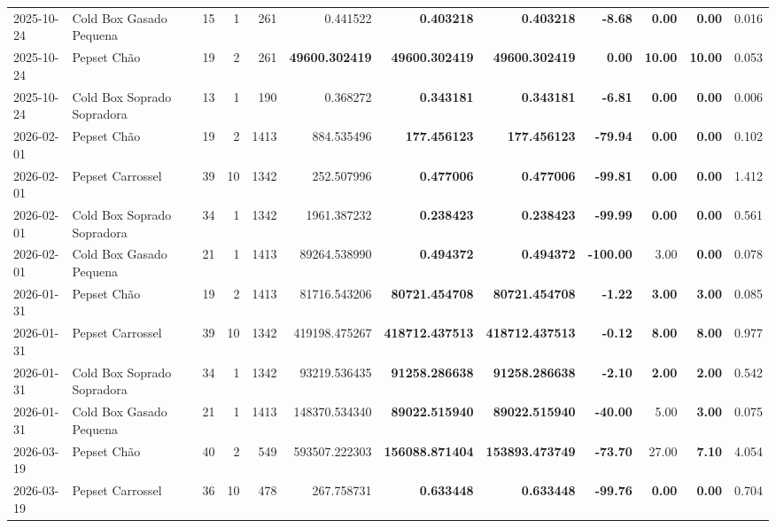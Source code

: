 {\begin{center}
{\begin{tabular}{@{}llrrrrrrrrrr@{}}
2025-10-24 & Cold Box Gasado Pequena & 15 & 1 & 261 & 0.441522 & \textbf{0.403218} & \textbf{0.403218} & \textbf{-8.68} & \textbf{0.00} & \textbf{0.00} & 0.016 \\
2025-10-24 & Pepset Chão & 19 & 2 & 261 & \textbf{49600.302419} & \textbf{49600.302419} & \textbf{49600.302419} & \textbf{0.00} & \textbf{10.00} & \textbf{10.00} & 0.053 \\
2025-10-24 & Cold Box Soprado Sopradora & 13 & 1 & 190 & 0.368272 & \textbf{0.343181} & \textbf{0.343181} & \textbf{-6.81} & \textbf{0.00} & \textbf{0.00} & 0.006 \\
2026-02-01 & Pepset Chão & 19 & 2 & 1413 & 884.535496 & \textbf{177.456123} & \textbf{177.456123} & \textbf{-79.94} & \textbf{0.00} & \textbf{0.00} & 0.102 \\
2026-02-01 & Pepset Carrossel & 39 & 10 & 1342 & 252.507996 & \textbf{0.477006} & \textbf{0.477006} & \textbf{-99.81} & \textbf{0.00} & \textbf{0.00} & 1.412 \\
2026-02-01 & Cold Box Soprado Sopradora & 34 & 1 & 1342 & 1961.387232 & \textbf{0.238423} & \textbf{0.238423} & \textbf{-99.99} & \textbf{0.00} & \textbf{0.00} & 0.561 \\
2026-02-01 & Cold Box Gasado Pequena & 21 & 1 & 1413 & 89264.538990 & \textbf{0.494372} & \textbf{0.494372} & \textbf{-100.00} & 3.00 & \textbf{0.00} & 0.078 \\
2026-01-31 & Pepset Chão & 19 & 2 & 1413 & 81716.543206 & \textbf{80721.454708} & \textbf{80721.454708} & \textbf{-1.22} & \textbf{3.00} & \textbf{3.00} & 0.085 \\
2026-01-31 & Pepset Carrossel & 39 & 10 & 1342 & 419198.475267 & \textbf{418712.437513} & \textbf{418712.437513} & \textbf{-0.12} & \textbf{8.00} & \textbf{8.00} & 0.977 \\
2026-01-31 & Cold Box Soprado Sopradora & 34 & 1 & 1342 & 93219.536435 & \textbf{91258.286638} & \textbf{91258.286638} & \textbf{-2.10} & \textbf{2.00} & \textbf{2.00} & 0.542 \\
2026-01-31 & Cold Box Gasado Pequena & 21 & 1 & 1413 & 148370.534340 & \textbf{89022.515940} & \textbf{89022.515940} & \textbf{-40.00} & 5.00 & \textbf{3.00} & 0.075 \\
2026-03-19 & Pepset Chão & 40 & 2 & 549 & 593507.222303 & \textbf{156088.871404} & \textbf{153893.473749} & \textbf{-73.70} & 27.00 & \textbf{7.10} & 4.054 \\
2026-03-19 & Pepset Carrossel & 36 & 10 & 478 & 267.758731 & \textbf{0.633448} & \textbf{0.633448} & \textbf{-99.76} & \textbf{0.00} & \textbf{0.00} & 0.704 \\

\end{tabular}}
\end{center}}
